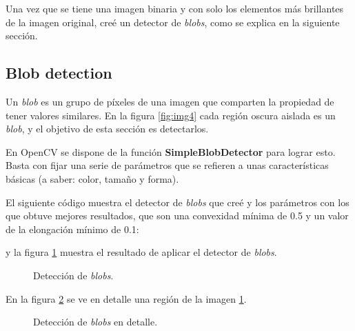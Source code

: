 \documentclass[a4paper,12pt]{article}
\begin{document}
Una vez que se tiene una imagen binaria y con solo los elementos más brillantes de la imagen original, creé un detector de \textit{blobs}, como se explica en la siguiente sección.

\subsection{Blob detection}

Un \textit{blob} es un grupo de píxeles de una imagen que comparten la propiedad de tener valores similares. En la figura \ref{fig:img4} cada región oscura aislada es un \textit{blob}, y el objetivo de esta sección es detectarlos.

En OpenCV se dispone de la función \textbf{SimpleBlobDetector} para lograr esto. Basta con fijar una serie de parámetros que se refieren a unas características básicas (a saber: color, tamaño y forma).

El siguiente código muestra el detector de \textit{blobs} que creé y los parámetros con los que obtuve mejores resultados, que son una convexidad mínima de 0.5 y un valor de la elongación mínimo de 0.1:


y la figura \ref{fig:img5} muestra el resultado de aplicar el detector de \textit{blobs}.
\begin{figure}[h!]
\centering
{}
\caption{Detección de \textit{blobs}.}
\label{fig:img5}
\end{figure}

En la figura \ref{fig:img6} se ve en detalle una región de la imagen \ref{fig:img5}.
\begin{figure}[h!]
\centering
{}
\caption{Detección de \textit{blobs} en detalle.}
\label{fig:img6}
\end{figure}
\end{document}
